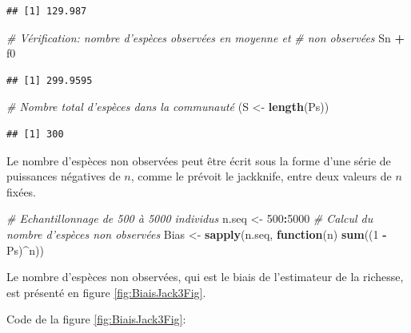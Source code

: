 \documentclass[
  11pt,
  french,
  a4paper,
  extrafontsizes,onecolumn,openright
  ]{memoir}
\newenvironment{Shaded}{\begin{snugshade}}{\end{snugshade}}
\newcommand{\CommentTok}[1]{\textcolor[rgb]{0.56,0.35,0.01}{\textit{#1}}}
\newcommand{\ControlFlowTok}[1]{\textcolor[rgb]{0.13,0.29,0.53}{\textbf{#1}}}
\newcommand{\DecValTok}[1]{\textcolor[rgb]{0.00,0.00,0.81}{#1}}
\newcommand{\KeywordTok}[1]{\textcolor[rgb]{0.13,0.29,0.53}{\textbf{#1}}}
\newcommand{\NormalTok}[1]{#1}
\newcommand{\OperatorTok}[1]{\textcolor[rgb]{0.81,0.36,0.00}{\textbf{#1}}}
\newcommand{\StringTok}[1]{\textcolor[rgb]{0.31,0.60,0.02}{#1}}
\begin{document}
\begin{verbatim}
## [1] 129.987
\end{verbatim}

\begin{Shaded}
\begin{Highlighting}[]
\CommentTok{# Vérification: nombre d'espèces observées en moyenne et}
\CommentTok{# non observées}
\NormalTok{Sn }\OperatorTok{+}\StringTok{ }\NormalTok{f0}
\end{Highlighting}
\end{Shaded}

\begin{verbatim}
## [1] 299.9595
\end{verbatim}

\begin{Shaded}
\begin{Highlighting}[]
\CommentTok{# Nombre total d'espèces dans la communauté}
\NormalTok{(S <-}\StringTok{ }\KeywordTok{length}\NormalTok{(Ps))}
\end{Highlighting}
\end{Shaded}

\begin{verbatim}
## [1] 300
\end{verbatim}

\normalsize

Le nombre d'espèces non observées peut être écrit sous la forme d'une série de puissances négatives de \(n\), comme le prévoit le jackknife, entre deux valeurs de \(n\) fixées.

\scriptsize

\begin{Shaded}
\begin{Highlighting}[]
\CommentTok{# Echantillonnage de 500 à 5000 individus}
\NormalTok{n.seq <-}\StringTok{ }\DecValTok{500}\OperatorTok{:}\DecValTok{5000}
\CommentTok{# Calcul du nombre d'espèces non observées}
\NormalTok{Bias <-}\StringTok{ }\KeywordTok{sapply}\NormalTok{(n.seq, }\ControlFlowTok{function}\NormalTok{(n) }\KeywordTok{sum}\NormalTok{((}\DecValTok{1} \OperatorTok{-}\StringTok{ }\NormalTok{Ps)}\OperatorTok{^}\NormalTok{n))}
\end{Highlighting}
\end{Shaded}

\normalsize

Le nombre d'espèces non observées, qui est le biais de l'estimateur de la richesse, est présenté en figure \ref{fig:BiaisJack3Fig}.

Code de la figure \ref{fig:BiaisJack3Fig}:
\end{document}
